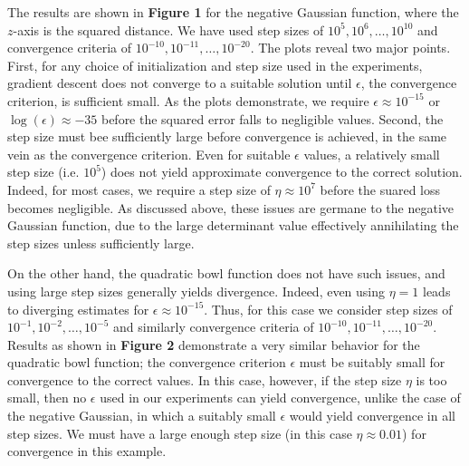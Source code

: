 \documentclass[psamsfonts]{amsart}
\theoremstyle{definition}
\theoremstyle{remark}
\numberwithin{equation}{section}
\begin{document}
The results are shown in {\bf Figure 1} for the negative Gaussian function, where the $z$-axis is the squared distance. We have used step sizes of $10^5, 10^6, \dots, 10^10$ and convergence criteria of $10^{-10}, 10^{-11}, \dots, 10^{-20}$. The plots reveal two major points. First, for any choice of initialization and step size used in the experiments, gradient descent does not converge to a suitable solution until $\epsilon$, the convergence criterion, is sufficient small. As the plots demonstrate, we require $\epsilon \approx 10^{-15}$ or $\log(\epsilon) \approx -35$ before the squared error falls to negligible values. Second, the step size must bee sufficiently large before convergence is achieved, in the same vein as the convergence criterion. Even for suitable $\epsilon$ values, a relatively small step size (i.e. $10^5$) does not yield approximate convergence to the correct solution. Indeed, for most cases, we require a step size of $\eta \approx 10^7$ before the suared loss becomes negligible. As discussed above, these issues are germane to the negative Gaussian function, due to the large determinant value effectively annihilating the step sizes unless sufficiently large.

On the other hand, the quadratic bowl function does not have such issues, and using large step sizes generally yields divergence. Indeed, even using $\eta = 1$ leads to diverging estimates for $\epsilon \approx 10^{-15}$. Thus, for this case we consider step sizes of $10^{-1}, 10^{-2}, \dots, 10^{-5}$ and similarly convergence criteria of $10^{-10}, 10^{-11}, \dots, 10^{-20}$. Results as shown in {\bf Figure 2} demonstrate a very similar behavior for the quadratic bowl function; the convergence criterion $\epsilon$ must be suitably small for convergence to the correct values. In this case, however, if the step size $\eta$ is too small, then no $\epsilon$ used in our experiments can yield convergence, unlike the case of the negative Gaussian, in which a suitably small $\epsilon$ would yield convergence in all step sizes. We must have a large enough step size (in this case $\eta \approx 0.01$) for convergence in this example.
\end{document}
